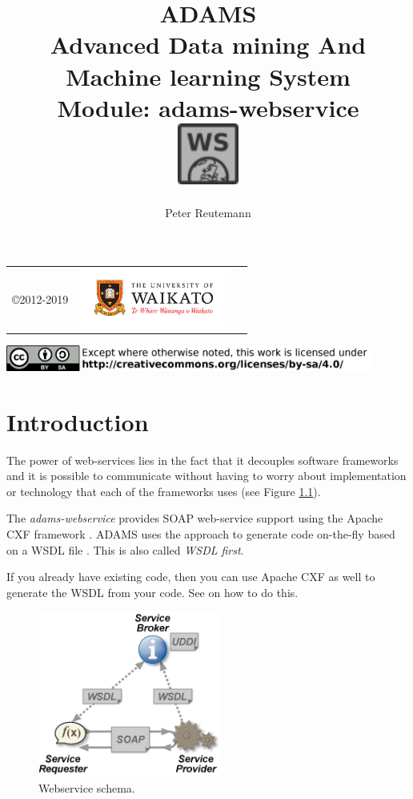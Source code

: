 \documentclass[a4paper]{book}
\title{
  \textbf{ADAMS} \\
  {\Large \textbf{A}dvanced \textbf{D}ata mining \textbf{A}nd \textbf{M}achine
  learning \textbf{S}ystem} \\
  {\Large Module: adams-webservice} \\
  \vspace{1cm}
  \includegraphics[width=2cm]{images/webservice-module.png} \\
}
\author{
  Peter Reutemann
}
\begin{document}
\begin{titlepage}
\maketitle

\thispagestyle{empty}
\center
\begin{table}[b]
	\begin{tabular}{c l l}
		\parbox[c][2cm]{2cm}{\copyright 2012-2019} &
		\parbox[c][2cm]{5cm}{\includegraphics[width=5cm]{images/coat_of_arms.pdf}} \\
	\end{tabular}
	\includegraphics[width=12cm]{images/cc.png} \\
\end{table}

\end{titlepage}

\tableofcontents
\listoffigures

\chapter{Introduction}
The power of web-services \cite{webservice} lies in the fact that it decouples
software frameworks and it is possible to communicate without having to worry
about implementation or technology that each of the frameworks uses (see 
Figure \ref{webservices}). 

The \textit{adams-webservice} provides SOAP \cite{soap} web-service support using the Apache CXF
framework \cite{cxf}. ADAMS uses the approach to generate code on-the-fly based on a 
WSDL file \cite{wsdl}. This is also called \textit{WSDL first}.

If you already have existing code, then you can use Apache CXF as well to 
generate the WSDL from your code. See \cite{cxf-contract-first} on how to do
this.

\begin{figure}[htb]
  \centering
  \includegraphics[width=6.0cm]{images/webservices.png}
  \caption{Webservice schema.}
  \label{webservices}
\end{figure}
\end{document}

